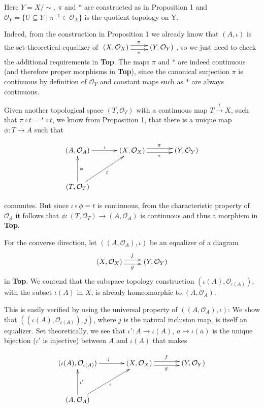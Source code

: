 \documentclass[a4paper]{amsart}            %
\renewcommand{\O}{\mathcal{O}}
\theoremstyle{plain}                                               %
\begin{document}
Here $Y=X/{\sim},\ \pi$ and $\ast$ are constructed as in Proposition 1 and $\O_Y = \{U \subseteq Y \mid \pi^{-1} \in \O_X\}$ is the quotient topology on Y.

Indeed, from the construction in Proposition 1 we already know that $(A, \iota)$ is the set-theoretical equalizer of $\xymatrix{(X,\O_X) \ar@<0.66ex>[r]^{\pi} \ar@<-0.66ex>[r]_{\ast} &(Y,\O_Y)}$, so we just need to check the additional requirements in \textbf{Top}. The maps $\pi$ and $\ast$ are indeed continuous (and therefore proper morphisms in \textbf{Top}), since the canonical surjection $\pi$ is continuous by definition of $\O_Y$ and constant maps such as $\ast$ are always continuous.

Given another topological space $(T, \O_T)$ with a continuous map $T \xrightarrow{t} X$, such that $\pi \circ t = \ast \circ t$, we know from Proposition 1, that there is a unique map $\phi:T \rightarrow A$ such that     

\begin{align*} \xymatrix@+=1.25cm{(A,\O_A) \ar[r]^{\iota} & (X,\O_X) \ar@<0.66ex>[r]^{\pi} \ar@<-0.66ex>[r]_{\ast} & (Y,\O_Y) \\
																										 (T,\O_T) \ar[u]_{\phi} \ar[ur]_t} \end{align*}
																										 
commutes. But since $\iota \circ \phi = t$ is continuous, from the characteristic property of $\O_A$ it follows that $\phi:(T,\O_T) \rightarrow (A,\O_A)$ is continuous and thus a morphism in \textbf{Top}. 

\bigskip

For the converse direction, let $((A,\O_A), \iota)$ be an equalizer of a diagram \[\xymatrix{(X,\O_X) \ar@<0.66ex>[r]^{f} \ar@<-0.66ex>[r]_{g} &(Y,\O_Y)}\] in \textbf{Top}. We contend that the subspace topology construction $(\iota(A), \O_{\iota(A)})$, with the subset $\iota(A)$ in $X$, is already homeomorphic to $(A,\O_A)$. 

This is easily verified by using the universal property of $((A, \O_A), \iota)$: We show that $((\iota(A), \O_{\iota(A)}), j)$, where $j$ is the natural inclusion map, is itself an equalizer. Set theoretically, we see that $\iota': A \to \iota(A),\, a \mapsto \iota(a)$ is the unique bijection ($\iota'$ is injective) between $A$ and $\iota(A)$  that makes 

\begin{align*} \xymatrix@+=1.25cm{(\iota(A),\O_{\iota(A)}) \ar[r]^{j} & (X,\O_X) \ar@<0.66ex>[r]^{f} \ar@<-0.66ex>[r]_{g} & (Y,\O_Y) \\
																										 (A,\O_A) \ar[u]_{\iota'} \ar[ur]_\iota} \end{align*}
\end{document}
